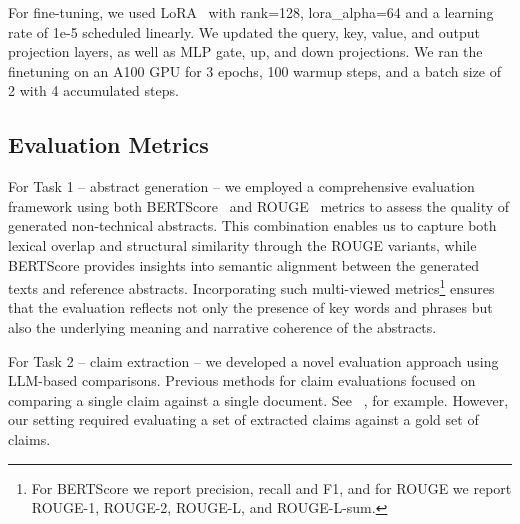 \documentclass[11pt]{article}
\begin{document}
For fine-tuning, we used LoRA~\cite{hu2021lora} with rank=128, lora\_alpha=64 and a learning rate of 1e-5 scheduled linearly. We updated the query, key, value, and output projection layers, as well as MLP gate, up, and down projections. We ran the finetuning on an A100 GPU for 3 epochs, 100 warmup steps, and a batch size of 2 with 4 accumulated steps. 

\subsection{Evaluation Metrics}

For Task 1 -- abstract generation -- we employed a comprehensive evaluation framework using both BERTScore~\cite{zhang2020bertscore} and ROUGE~\cite{lin-2004-rouge} metrics to assess the quality of generated non-technical abstracts. This combination enables us to capture both lexical overlap and structural similarity through the ROUGE variants, while BERTScore provides insights into semantic alignment between the generated texts and reference abstracts. Incorporating such multi-viewed metrics\footnote{For BERTScore we report precision, recall and F1, and for ROUGE we report ROUGE-1, ROUGE-2, ROUGE-L, and ROUGE-L-sum.} ensures that the evaluation reflects not only the presence of key words and phrases but also the underlying meaning and narrative coherence of the abstracts.

For Task 2 -- claim extraction -- we developed a novel evaluation approach using LLM-based comparisons. Previous methods for claim evaluations focused on comparing a single claim against a single document. See ~\citet{tang-etal-2024-minicheck}, for example. However, our setting required evaluating a set of extracted claims against a gold set of claims.
\end{document}
